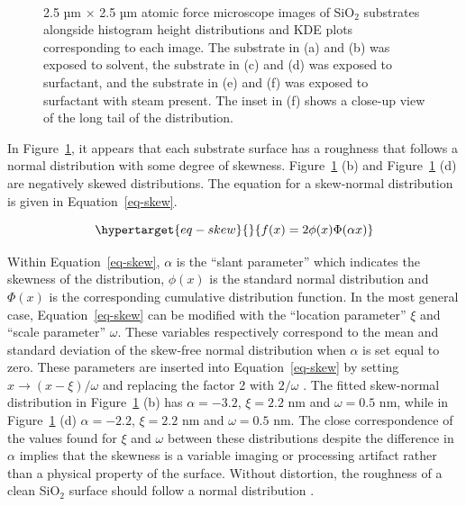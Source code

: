 \documentclass[
  a4paper,
]{scrbook}
\begin{document}
\begin{figure}
\begin{minipage}[t]{0.45\linewidth}
{{}

}

\end{minipage}%
%
\begin{minipage}[t]{0.01\linewidth}

{\centering 

~

}

\end{minipage}%

\caption[Atomic force microscope images of SiO\(_2\) substrates
alongside histogram height distributions and KDE plots corresponding to
each image.]{\label{fig-afm-substrate}2.5 µm \(\times\) 2.5 µm atomic
force microscope images of SiO\(_2\) substrates alongside histogram
height distributions and KDE plots corresponding to each image. The
substrate in (a) and (b) was exposed to solvent, the substrate in (c)
and (d) was exposed to surfactant, and the substrate in (e) and (f) was
exposed to surfactant with steam present. The inset in (f) shows a
close-up view of the long tail of the distribution.}

\end{figure}

In Figure~\ref{fig-afm-substrate}, it appears that each substrate
surface has a roughness that follows a normal distribution with some
degree of skewness. Figure~\ref{fig-afm-substrate} (b) and
Figure~\ref{fig-afm-substrate} (d) are negatively skewed distributions.
The equation for a skew-normal distribution is given in
Equation~\ref{eq-skew}.

\begin{equation}\protect\hypertarget{eq-skew}{}{
f(x) = 2\phi(x)\Phi(\alpha x)
}\label{eq-skew}\end{equation}

Within Equation~\ref{eq-skew}, \(\alpha\) is the ``slant parameter''
which indicates the skewness of the distribution, \(\phi(x)\) is the
standard normal distribution and \(\Phi(x)\) is the corresponding
cumulative distribution function. In the most general case,
Equation~\ref{eq-skew} can be modified with the ``location parameter''
\(\xi\) and ``scale parameter'' \(\omega\). These variables respectively
correspond to the mean and standard deviation of the skew-free normal
distribution when \(\alpha\) is set equal to zero. These parameters are
inserted into Equation~\ref{eq-skew} by setting
\(x \rightarrow (x-\xi)/\omega\) and replacing the factor 2 with
\(2/\omega\) \autocite{Azzalini2013}. The fitted skew-normal
distribution in Figure~\ref{fig-afm-substrate} (b) has
\(\alpha = -3.2\), \(\xi = 2.2\) nm and \(\omega = 0.5\) nm, while in
Figure~\ref{fig-afm-substrate} (d) \(\alpha = -2.2\), \(\xi = 2.2\) nm
and \(\omega = 0.5\) nm. The close correspondence of the values found
for \(\xi\) and \(\omega\) between these distributions despite the
difference in \(\alpha\) implies that the skewness is a variable imaging
or processing artifact rather than a physical property of the surface.
Without distortion, the roughness of a clean SiO\(_2\) surface should
follow a normal distribution \autocite{Velicky2015}.
\end{document}
